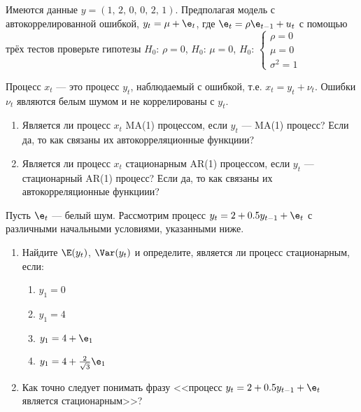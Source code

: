 \documentclass[pdftex,11pt,openany]{book}\usepackage[]{graphicx}\usepackage[]{color}
\begin{document}
\begin{solution}
\end{solution}



\begin{problem}
Имеются данные $y=(1,\, 2,\, 0,\,  0,\, 2,\, 1)$. Предполагая модель с автокоррелированной ошибкой, $y_t=\mu+\e_t$, где $\e_t=\rho \e_{t-1}+u_t$ с помощью трёх тестов проверьте гипотезы
$H_0$: $\rho=0$, 
$H_0$: $\mu=0$, 
$H_0$: $\begin{cases}
\rho=0 \\
\mu = 0 \\
\sigma^2=1 
\end{cases}$
\end{problem}


\begin{solution}

\end{solution}


\begin{problem}
Процесс $x_t$ --- это процесс $y_t$, наблюдаемый с ошибкой, т.е. $x_t=y_t+\nu_t$. Ошибки $\nu_t$ являются белым шумом и не коррелированы с $y_t$. 
\begin{enumerate}
\item Является ли процесс $x_t$ MA(1) процессом, если $y_t$ ---  MA(1) процесс? Если да, то как связаны их автокорреляционные функциии?
\item Является ли процесс $x_t$ стационарным AR(1) процессом, если $y_t$ ---  стационарный AR(1) процесс? Если да, то как связаны их автокорреляционные функциии?
\end{enumerate}
\end{problem}

\begin{solution}

\end{solution}

\begin{problem}
Пусть $\e_t$ --- белый шум. Рассмотрим процесс $y_t=2+0.5y_{t-1}+\e_t$ с различными начальными условиями, указанными ниже.

\begin{enumerate}
\item Найдите $\E(y_t)$, $\Var(y_t)$ и определите, является ли процесс  стационарным, если:
\begin{enumerate}
\item $y_1=0$
\item $y_1=4$
\item $y_1=4+\e_1$
\item $y_1=4+\frac{2}{\sqrt{3}}\e_1$
\end{enumerate}
\item Как точно следует понимать фразу <<процесс $y_t=2+0.5y_{t-1}+\e_t$ является стационарным>>?
\end{enumerate}

\end{problem}
\end{document}
